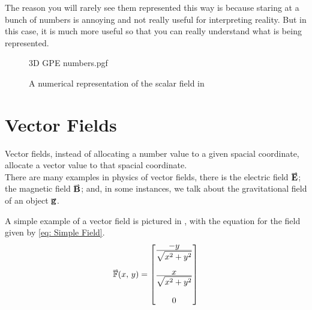 \documentclass[main.tex]{subfiles}
\begin{document}
            The reason you will rarely see them represented this way is because staring at a bunch of numbers is annoying and not really useful for interpreting reality. But in this case, it is much more useful so that you can really understand what is being represented.

            \begin{figure}[!h]
                \centering
                \scalebox{1}
                {
                    \begin{adjustbox}{clip,trim=30mm 30mm 20mm 25mm}
                        {{3D GPE numbers.pgf}}
                    \end{adjustbox}
                }
                \caption{A numerical representation of the scalar field in }
                \label{fig: 3D Number GPE}
            \end{figure}
            \FloatBarrier


        \newpage
        \section{Vector Fields}
            \label{sec: Vector Fields}

            Vector fields, instead of allocating a number value to a given spacial coordinate, allocate a vector value to that spacial coordinate.\\
            There are many examples in physics of vector fields, there is the electric field $\vect{E}$; the magnetic field $\vect{B}$; and, in some instances, we talk about the gravitational field of an object $\vect{g}$.

            A simple example of a vector field is pictured in , with the equation for the field given by \eqref{eq: Simple Field}.
            \begin{equation}
                \hvec{\mathbb{F}}(x,\, y) = \Matrix{\bfrac{-y}{\sqrt{x^2 + y^2}}\vspace{4mm}\\\bfrac{x}{\sqrt{x^2 + y^2}}\vspace{4mm}\\0}
                \label{eq: Simple Field}
            \end{equation}
\end{document}
